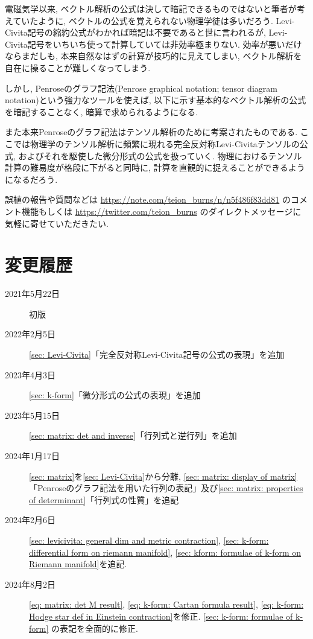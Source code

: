 \documentclass[dvipdfmx]{jsarticle}
\begin{document}
\maketitle

電磁気学以来, ベクトル解析の公式は決して暗記できるものではないと筆者が考えていたように, ベクトルの公式を覚えられない物理学徒は多いだろう.
Levi-Civita記号の縮約公式がわかれば暗記は不要であると世に言われるが, Levi-Civita記号をいちいち使って計算していては非効率極まりない.
効率が悪いだけならまだしも, 本来自然なはずの計算が技巧的に見えてしまい, ベクトル解析を自在に操ることが難しくなってしまう.

しかし, Penroseのグラフ記法(Penrose graphical notation; tensor diagram notation)という強力なツールを使えば, 以下に示す基本的なベクトル解析の公式を暗記することなく, 暗算で求められるようになる.

また本来Penroseのグラフ記法はテンソル解析のために考案されたものである.
ここでは物理学のテンソル解析に頻繁に現れる完全反対称Levi-Civitaテンソルの公式, およびそれを駆使した微分形式の公式を扱っていく.
物理におけるテンソル計算の難易度が格段に下がると同時に, 計算を直観的に捉えることができるようになるだろう.

誤植の報告や質問などは
\url{https://note.com/teion_burns/n/n5f486f83dd81}
のコメント機能もしくは
\url{https://twitter.com/teion_burns}
のダイレクトメッセージに気軽に寄せていただきたい.


\section*{変更履歴}
\begin{description}
    \item[2021年5月22日] 初版
    \item[2022年2月5日] \ref{sec: Levi-Civita}「完全反対称Levi-Civita記号の公式の表現」を追加
    \item[2023年4月3日] \ref{sec: k-form}「微分形式の公式の表現」を追加
    \item[2023年5月15日] \ref{sec: matrix: det and inverse}「行列式と逆行列」を追加
    \item[2024年1月17日] \ref{sec: matrix}を\ref{sec: Levi-Civita}から分離, \ref{sec: matrix: display of matrix}「Penroseのグラフ記法を用いた行列の表記」及び\ref{sec: matrix: properties of determinant}「行列式の性質」を追記
    \item[2024年2月6日] \ref{sec: levicivita: general dim and metric contraction}, \ref{sec: k-form: differential form on riemann manifold}, \ref{sec: kform: formulae of k-form on Riemann manifold}を追記.
    \item[2024年8月2日] \eqref{eq: matrix: det M result}, \eqref{eq: k-form: Cartan formula result}, \eqref{eq: k-form: Hodge star def in Einstein contraction}を修正. \ref{sec: k-form: formulae of k-form} の表記を全面的に修正.
\end{description}
\end{document}
